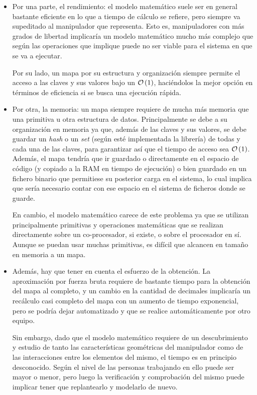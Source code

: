 \begin{itemize}
    \item Por una parte, el rendimiento: el modelo matemático suele ser en general
    bastante eficiente en lo que a tiempo de cálculo se refiere, pero siempre va
    supeditado al manipulador que representa. Esto es, manipuladores con más
    grados de libertad implicaría un modelo matemático mucho más complejo que según
    las operaciones que implique puede no ser viable para el sistema en que se va a ejecutar.

    Por su lado, un mapa por su estructura y organización siempre permite el acceso a las
    claves y sus valores bajo un $\bigO{1}$, haciéndolos la mejor opción en términos
    de eficiencia si se busca una ejecución rápida.

    \item Por otra, la memoria: un mapa siempre requiere de mucha más memoria que 
    una primitiva u otra estructura de datos. Principalmente se debe a su organización
    en memoria ya que, además de las claves y sus valores, se debe guardar un \textit{hash}
    o un \textit{set} (según esté implementada la librería) de todas y cada una de las 
    claves, para garantizar así que el tiempo de acceso sea $\bigO{1}$.
    Además, el mapa tendría que ir guardado o directamente en el espacio de código
    (y copiado a la \ac{RAM} en tiempo de ejecución) o bien guardado en un fichero
    binario que permitiese su posterior carga en el sistema, lo cual implica que sería
    necesario contar con ese espacio en el sistema de ficheros donde se guarde.

    En cambio, el modelo matemático carece de este problema ya que se utilizan
    principalmente primitivas y operaciones matemáticas que se realizan directamente
    sobre un co-procesador, si existe, o sobre el procesador en sí. Aunque se puedan
    usar muchas primitivas, es difícil que alcancen en tamaño en memoria a un mapa.

    \item Además, hay que tener en cuenta el esfuerzo de la obtención. La aproximación
    por fuerza bruta requiere de bastante tiempo para la obtención del mapa al completo,
    y un cambio en la cantidad de decimales implicaría un recálculo casi completo del mapa
    con un aumento de tiempo exponencial, pero se podría dejar automatizado y que se realice
    automáticamente por otro equipo.

    Sin embargo, dado que el modelo matemático requiere de un descubrimiento y estudio
    de tanto las características geométricas del manipulador como de las interacciones
    entre los elementos del mismo, el tiempo es en principio desconocido. Según el nivel
    de las personas trabajando en ello puede ser mayor o menor, pero luego la verificación
    y comprobación del mismo puede implicar tener que replantearlo y modelarlo de nuevo.
\end{itemize}

